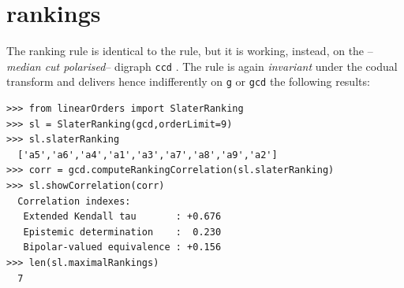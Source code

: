 \section{\Slater rankings}
\label{sec:8.5}

The \Slater ranking rule is identical to the \Kemeny rule, but it is working, instead, on the \Condorcet --\emph{median cut polarised}-- digraph \texttt{ccd} \citep{SLA-1961}. The \Slater rule is again \emph{invariant} under the codual transform and delivers hence indifferently on \texttt{g} or \texttt{gcd} the following results:
\begin{lstlisting}[caption={Computing a \Slater ranking},label=list:8.12]   
>>> from linearOrders import SlaterRanking
>>> sl = SlaterRanking(gcd,orderLimit=9)
>>> sl.slaterRanking
  ['a5','a6','a4','a1','a3','a7','a8','a9','a2']
>>> corr = gcd.computeRankingCorrelation(sl.slaterRanking)
>>> sl.showCorrelation(corr)
  Correlation indexes:
   Extended Kendall tau       : +0.676
   Epistemic determination    :  0.230
   Bipolar-valued equivalence : +0.156
>>> len(sl.maximalRankings)
  7
\end{lstlisting}

